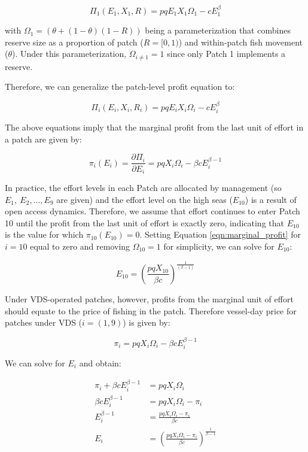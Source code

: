 \documentclass[12pt]{article}
\begin{document}
$$
\Pi_1(E_1,X_1,R) = pqE_1X_1\Omega_1-cE_1^\beta
$$

\noindent with $\Omega_1 = (\theta + (1 - \theta)(1 - R))$ being a parameterization that combines reserve size as a proportion of patch ($R =  [0, 1)$) and within-patch fish movement ($\theta$). Under this parameterization, $\Omega_{i \neq 1} = 1$ since only Patch 1 implements a reserve.

Therefore, we can generalize the patch-level profit equation to:

$$
\Pi_i(E_i,X_i, R_i) = pqE_iX_i\Omega_i-cE_i^\beta
$$

\noindent The above equations imply that the marginal profit from the last unit of effort in a patch are given by:

\begin{equation}
\pi_i(E_i) = \frac{\partial \Pi_i}{\partial E_i} = pqX_i\Omega_i - \beta cE_i^{\beta-1}
\label{eqn:marginal_profit}
\end{equation}

In practice, the effort levels in each Patch are allocated by management (so $E_{1},\ E_{2},...,E_{9}$ are given) and the
effort level on the high seas ($E_{10}$) is a result of open access dynamics. Therefore, we assume that effort continues to enter Patch 10 until the profit from the last unit of effort is exactly zero, indicating that $E_{10}$ is the value for which $\pi_{10}(E_{10})  = 0$. Setting Equation \ref{eqn:marginal_profit} for $i = 10$ equal to zero and removing $\Omega_{10} = 1$ for simplicity, we can solve for $E_{10}$:

\begin{equation}
E_{10} = \left(\frac{pqX_{10}}{\beta c}\right)^{\frac{1}{(\beta - 1)}}
\label{eqn:effort_hs}
\end{equation}

Under VDS-operated patches, however, profits from the marginal unit of effort should equate to the price of fishing in the patch. Therefore vessel-day price for patches under VDS ($i = (1, 9)$) is  given by:

$$
\pi_i = pqX_i\Omega_i - \beta c E_i ^{\beta - 1}
$$

\noindent We can solve for $E_i$ and obtain:

\begin{equation}
	\begin{split}
		\pi_i + \beta c E_i ^{\beta - 1} &= pqX_i\Omega_i \\
		\beta c E_i ^{\beta - 1} &= pqX_i\Omega_i - \pi_i \\
		E_i ^{\beta - 1} &= \frac{pqX_i\Omega_i - \pi_i}{\beta c} \\
		E_i &= \left(\frac{pqX_i\Omega_i - \pi_i}{\beta c }\right) ^ {\frac{1}{\beta - 1}}
	\end{split}
\label{eqn:demands}
\end{equation}
\end{document}
